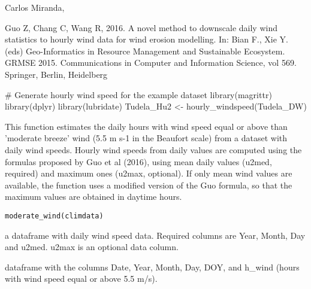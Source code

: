 \documentclass[a4paper]{book}
\begin{document}
%
\begin{Author}\relax
Carlos Miranda, 
\end{Author}
%
\begin{References}\relax
Guo Z, Chang C, Wang R, 2016. A novel method to downscale daily wind
statistics to hourly wind data for wind erosion modelling. In: Bian F.,
Xie Y. (eds) Geo-Informatics in Resource Management and Sustainable
Ecosystem. GRMSE 2015. Communications in Computer and Information Science,
vol 569. Springer, Berlin, Heidelberg
\end{References}
%
\begin{Examples}
\begin{ExampleCode}

# Generate hourly wind speed for the example dataset
library(magrittr)
library(dplyr)
library(lubridate)
Tudela_Hu2 <- hourly_windspeed(Tudela_DW)

\end{ExampleCode}
\end{Examples}
%
\begin{Description}\relax
This function estimates the daily hours with wind speed equal or
above than 'moderate breeze' wind (5.5 m s-1 in the Beaufort scale)
from a dataset with daily wind speeds. Hourly wind speeds
from daily values are computed using the formulas proposed
by Guo et al (2016), using mean daily values (u2med, required)
and maximum ones (u2max, optional). If only mean wind values
are available, the function uses a modified version of the 
Guo formula, so that the maximum values are obtained in 
daytime hours.
\end{Description}
%
\begin{Usage}
\begin{verbatim}
moderate_wind(climdata)
\end{verbatim}
\end{Usage}
%
\begin{Arguments}
\begin{ldescription}
\item[\code{climdata}] a dataframe with daily wind speed data.
Required columns are Year, Month, Day and u2med. u2max
is an optional data column.
\end{ldescription}
\end{Arguments}
%
\begin{Value}
dataframe with the columns Date, Year, Month, Day, DOY,
and h\_wind (hours with wind speed equal or above 5.5 m/s).
\end{Value}
\end{document}
